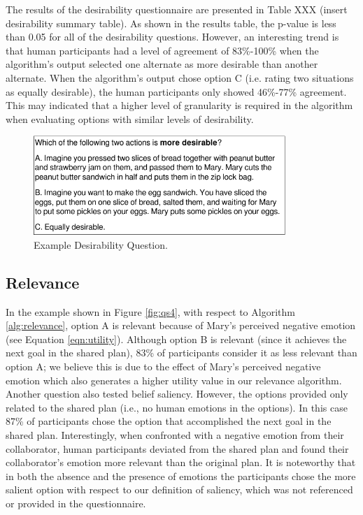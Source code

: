 \documentclass[12pt]{report}
\begin{document}
The results of the desirability questionnaire are presented in Table XXX
(insert desirability summary table). As shown in the results table, the p-value
is less than 0.05 for all of the desirability questions. However, an interesting
trend is that human participants had a level of agreement of 83\%-100\% when the
algorithm's output selected one alternate as more desirable than another
alternate. When the algorithm's output chose option C (i.e. rating two
situations as equally desirable), the human participants only showed 46\%-77\%
agreement. This may indicated that a higher level of granularity is required in
the algorithm when evaluating options with similar levels of desirability. 

\begin{figure}[tbh]
  \centering
  \includegraphics[width=0.85\textwidth]{figure/question-sample3-croped.pdf}
  \caption{{\fontsize{9}{9}\selectfont Example Desirability Question.}}
  \label{fig:qs3}
\end{figure}

\subsection{Relevance}
\label{sec:relevance-crowdsourcing}
In the example shown in Figure \ref{fig:qs4}, with respect to Algorithm
\ref{alg:relevance}, option A is relevant because of Mary's perceived negative
emotion (see Equation \ref{eqn:utility}). Although option B is relevant (since
it achieves the next goal in the shared plan), 83\% of participants consider it as
less relevant than option A; we believe this is due to the effect of Mary's
perceived negative emotion which also generates a higher utility value in our
relevance algorithm. Another question also tested belief saliency. However, the
options provided only related to the shared plan (i.e., no human emotions in the
options). In this case 87\% of participants chose the option that accomplished the
next goal in the shared plan. Interestingly, when confronted with a negative
emotion from their collaborator, human participants deviated from the shared plan
and found their collaborator's emotion more relevant than the original plan. It
is noteworthy that in both the absence and the presence of emotions the
participants chose the more salient option with respect to our definition of
saliency, which was not referenced or provided in the questionnaire.
\end{document}
